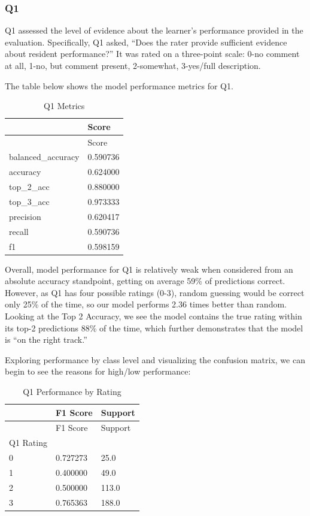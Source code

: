 \documentclass[
  letterpaper,
  DIV=11,
  numbers=noendperiod]{scrartcl}
\begin{document}
\hypertarget{q1}{%
\subsubsection{Q1}\label{q1}}

Q1 assessed the level of evidence about the learner's performance
provided in the evaluation. Specifically, Q1 asked, ``Does the rater
provide sufficient evidence about resident performance?'' It was rated
on a three-point scale: 0-no comment at all, 1-no, but comment present,
2-somewhat, 3-yes/full description.

The table below shows the model performance metrics for Q1.

\hypertarget{tbl-q1metrics}{}
\begin{longtable}[]{@{}ll@{}}
\caption{\label{tbl-q1metrics}Q1 Metrics}\tabularnewline
\toprule()
& Score \\
\midrule()
\endfirsthead
\toprule()
& Score \\
\midrule()
\endhead
balanced\_accuracy & 0.590736 \\
accuracy & 0.624000 \\
top\_2\_acc & 0.880000 \\
top\_3\_acc & 0.973333 \\
precision & 0.620417 \\
recall & 0.590736 \\
f1 & 0.598159 \\
\bottomrule()
\end{longtable}

Overall, model performance for Q1 is relatively weak when considered
from an absolute accuracy standpoint, getting on average 59\% of
predictions correct. However, as Q1 has four possible ratings (0-3),
random guessing would be correct only 25\% of the time, so our model
performs 2.36 times better than random. Looking at the Top 2 Accuracy,
we see the model contains the true rating within its top-2 predictions
88\% of the time, which further demonstrates that the model is ``on the
right track.''

Exploring performance by class level and visualizing the confusion
matrix, we can begin to see the reasons for high/low performance:

\hypertarget{tbl-q1byrating}{}
\begin{longtable}[]{@{}lll@{}}
\caption{\label{tbl-q1byrating}Q1 Performance by Rating}\tabularnewline
\toprule()
& F1 Score & Support \\
\midrule()
\endfirsthead
\toprule()
& F1 Score & Support \\
\midrule()
\endhead
Q1 Rating & & \\
0 & 0.727273 & 25.0 \\
1 & 0.400000 & 49.0 \\
2 & 0.500000 & 113.0 \\
3 & 0.765363 & 188.0 \\
\bottomrule()
\end{longtable}
\end{document}
